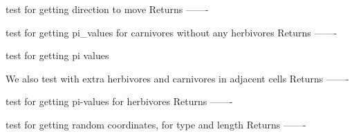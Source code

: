 \documentclass[a4paper,10pt,english]{sphinxmanual}
\begin{document}
\begin{fulllineitems}
\begin{fulllineitems}
\label{\detokenize{tests:biosim.tests.test_island.TestIsland.test_get_direction}}
test for getting direction to move
Returns
-------

\end{fulllineitems}


\begin{fulllineitems}
\label{\detokenize{tests:biosim.tests.test_island.TestIsland.test_get_pi_values_carnivores_no_herb}}
test for getting pi\_values for carnivores without any herbivores
Returns
-------

\end{fulllineitems}


\begin{fulllineitems}
\label{\detokenize{tests:biosim.tests.test_island.TestIsland.test_get_pi_values_carnivores_with_herbs_and_carns}}
test for getting pi values

We also test with extra herbivores and carnivores in adjacent cells
Returns
-------

\end{fulllineitems}


\begin{fulllineitems}
\label{\detokenize{tests:biosim.tests.test_island.TestIsland.test_get_pi_values_herbivores}}
test for getting pi-values for herbivores
Returns
-------

\end{fulllineitems}


\begin{fulllineitems}
\label{\detokenize{tests:biosim.tests.test_island.TestIsland.test_get_random_coordinates}}
test for getting random coordinates, for type and length
Returns
-------


\end{fulllineitems}
\end{fulllineitems}
\end{document}
